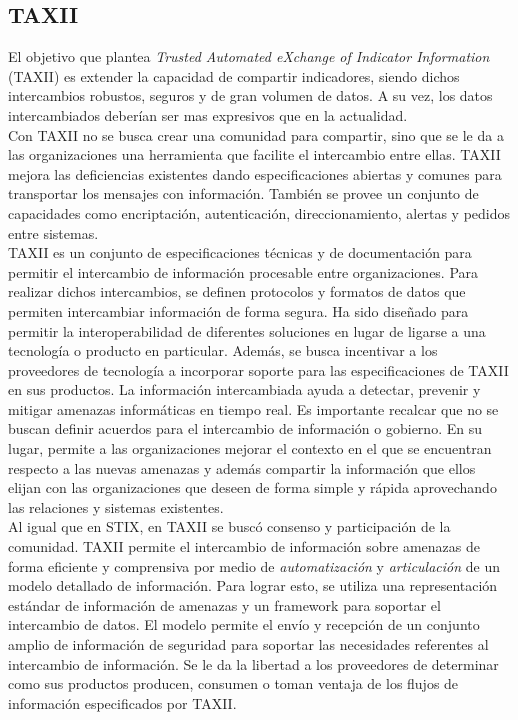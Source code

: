 \subsection{TAXII}

El objetivo que plantea \textit{Trusted Automated eXchange of Indicator Information} (TAXII) es extender la capacidad de compartir indicadores, 
siendo dichos intercambios robustos, seguros y de gran volumen de datos. A su 
vez, los datos intercambiados deberían ser mas expresivos que en la actualidad.\\

Con TAXII no se busca crear una comunidad para compartir, sino que se le da a 
las organizaciones una herramienta que facilite el intercambio entre ellas. 
TAXII mejora las deficiencias existentes dando especificaciones abiertas y 
comunes para transportar los mensajes con información. También se provee un 
conjunto de capacidades como encriptación, autenticación, direccionamiento, 
alertas y pedidos entre sistemas.\\

TAXII es un conjunto de especificaciones técnicas y de documentación para 
permitir el intercambio de información procesable entre organizaciones. Para 
realizar dichos intercambios, se definen protocolos y formatos de datos que 
permiten intercambiar información de forma segura. Ha sido diseñado para permitir la
interoperabilidad de diferentes soluciones en lugar de ligarse a una tecnología o producto en particular.
Además, se busca incentivar a los proveedores de tecnología a incorporar soporte para las especificaciones
de TAXII en sus productos. La información intercambiada 
ayuda a detectar, prevenir y mitigar amenazas informáticas en tiempo real. Es 
importante recalcar que no se buscan definir acuerdos para el intercambio de 
información o gobierno. En su lugar, permite a las organizaciones mejorar el 
contexto en el que se encuentran respecto a las nuevas amenazas y además 
compartir la información que ellos elijan con las organizaciones que deseen de 
forma simple y rápida aprovechando las relaciones y sistemas existentes.\\

Al igual que en STIX, en TAXII se buscó consenso y participación de la comunidad. 
TAXII permite el intercambio de información sobre amenazas de forma eficiente y 
comprensiva por medio de \emph{automatización} y \emph{articulación} de un 
modelo detallado de información. Para lograr esto, se utiliza una representación 
estándar de información de amenazas y un framework para soportar el intercambio 
de datos. El modelo permite el envío y recepción de un conjunto amplio de 
información de seguridad para soportar las necesidades referentes al intercambio 
de información. Se le da la libertad a los proveedores de determinar como sus 
productos producen, consumen o toman ventaja de los flujos de información 
especificados por TAXII.\\

